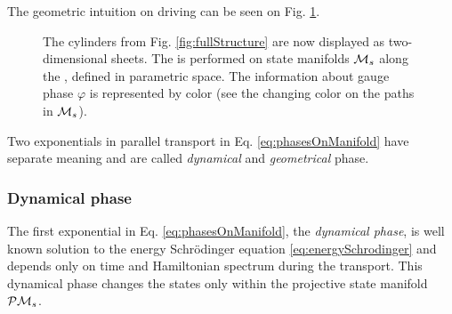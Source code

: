 The geometric intuition on driving can be seen on Fig. \ref{fig:manifoldCutIntuition}.
\begin{figure}[H]
    \centering
\caption{The cylinders from Fig. \ref{fig:fullStructure} are now displayed as two-dimensional sheets. The  is performed on state manifolds $\mathcal{M}_s$ along the , defined in parametric space. The information about gauge phase $\varphi$ is represented by color (see the changing color on the paths in $\mathcal{M}_s$).}
    \label{fig:manifoldCutIntuition}
\end{figure}

Two exponentials in parallel transport in Eq. \ref{eq:phasesOnManifold} have separate meaning and are called \emph{dynamical} and \emph{geometrical} phase.

\subsubsection{Dynamical phase}
The first exponential in Eq. \ref{eq:phasesOnManifold}, the \emph{dynamical phase}, is well known solution to the energy Schr\"odinger equation \ref{eq:energySchrodinger} and depends only on time and Hamiltonian spectrum during the transport. This dynamical phase changes the states only within the projective state manifold $\mathcal{P}\mathcal{M}_s$. 

